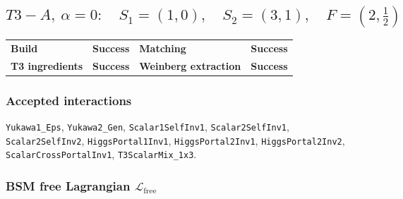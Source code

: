 \documentclass[10pt]{article}
\begin{document}
\subsection*{$T3-A,\ \alpha=0:\quad S_1=(1,0),\quad S_2=(3,1),\quad F=(2,\frac{1}{2})$}
\begin{center}
\begin{tabular}{>{\bfseries}l l >{\bfseries}l l}
\toprule
Build & \textbf{Success} & Matching & \textbf{Success} \\
T3 ingredients & \textbf{Success} & Weinberg extraction & \textbf{Success} \\
\bottomrule
\end{tabular}
\end{center}
\subsubsection*{Accepted interactions}
\texttt{Yukawa1\_Eps}, \texttt{Yukawa2\_Gen}, \texttt{Scalar1SelfInv1}, \texttt{Scalar2SelfInv1}, \texttt{Scalar2SelfInv2}, \texttt{HiggsPortal1Inv1}, \texttt{HiggsPortal2Inv1}, \texttt{HiggsPortal2Inv2}, \texttt{ScalarCrossPortalInv1}, \texttt{T3ScalarMix\_1x3}.
\subsubsection*{BSM free Lagrangian $\mathcal{L}_{\mathrm{free}}$}
\noindent{}\par
\smallskip
\noindent{}\par
\smallskip
\noindent{}\par
\smallskip
\noindent{}\par
\smallskip
\noindent{}\par
\smallskip
\noindent{}\par
\smallskip
\end{document}
